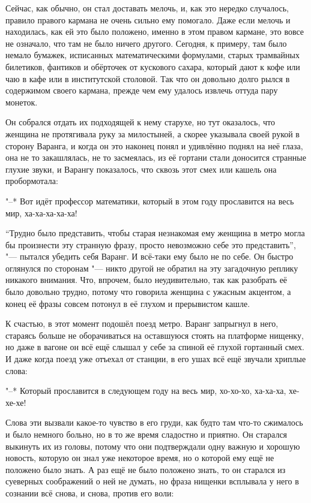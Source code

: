 Сейчас, как обычно, он стал доставать мелочь, и, как это нередко случалось,
правило правого кармана не очень сильно ему помогало.
Даже если мелочь и находилась, как ей это было положено, именно в этом правом
кармане, это вовсе не означало, что там не было ничего другого.
Сегодня, к примеру, там было немало бумажек, исписанных математическими
формулами, старых трамвайных билетиков, фантиков и обёрточек от кускового
сахара, который дают к кофе или чаю в кафе или в институтской столовой.
Так что он довольно долго рылся в содержимом своего кармана, прежде чем ему
удалось извлечь оттуда пару монеток.

Он собрался отдать их подходящей к нему старухе, но тут оказалось, что женщина
не протягивала руку за милостыней, а скорее указывала своей рукой в сторону
Варанга, и когда он это наконец понял и удивлённо поднял на неё глаза, она не то
закашлялась, не то засмеялась, из её гортани стали доносится странные глухие
звуки, и Варангу показалось, что сквозь этот смех или кашель она пробормотала:

"--* Вот идёт профессор математики, который в этом году прославится на весь мир,
ха-ха-ха-ха-ха!

\enquote{Трудно было представить, чтобы старая незнакомая ему женщина в метро
могла бы произнести эту странную фразу, просто невозможно себе это представить},
"--- пытался убедить себя Варанг.
И всё-таки ему было не по себе.
Он быстро оглянулся по сторонам "--- никто другой не обратил на эту загадочную
реплику никакого внимания.
Что, впрочем, было неудивительно, так как разобрать её было довольно трудно,
потому что говорила женщина с ужасным акцентом, а конец её фразы совсем потонул
в её глухом и прерывистом кашле.

К счастью, в этот момент подошёл поезд метро.
Варанг запрыгнул в него, стараясь больше не оборачиваться на оставшуюся стоять
на платформе нищенку, но даже в вагоне он всё ещё слышал у себе за спиной её
глухой гортанный смех.
И даже когда поезд уже отъехал от станции, в его ушах всё ещё звучали хриплые
слова:

"--* Который прославится в следующем году на весь мир, хо-хо-хо, ха-ха-ха,
хе-хе-хе!

Слова эти вызвали какое-то чувство в его груди, как будто там что-то сжималось и
было немного больно, но в то же время сладостно и приятно.
Он старался выкинуть их из головы, потому что они подтверждали одну важную и
хорошую новость, которую он знал уже некоторое время, но о которой ему ещё не
положено было знать.
А раз ещё не было положено знать, то он старался из суеверных соображений о ней
не думать, но фраза нищенки всплывала у него в сознании всё снова, и снова,
против его воли:

